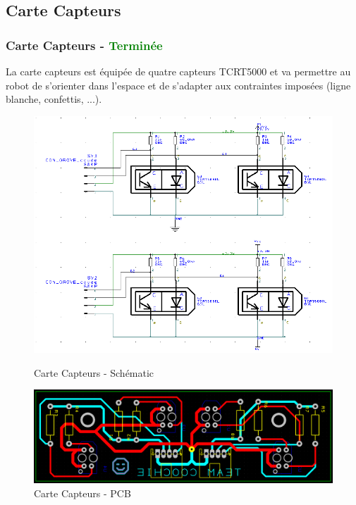 \subsection{Carte Capteurs}
\begin{frame}
    \frametitle{Carte Capteurs - \textcolor{green}{Terminée}}
    La carte capteurs est équipée de quatre capteurs TCRT5000 et va permettre au robot de s'orienter dans l'espace et de s'adapter aux contraintes imposées (ligne blanche, confettis, ...).

    \vfill
    \begin{figure}[H]
        \centering
        \begin{minipage}{.5\textwidth}
            \centering
            \includegraphics[width=.6\linewidth]{Images/carteCapteurs_sch.png}
            \caption{Carte Capteurs - Schématic}
            \label{fig:capteursch}
        \end{minipage}%
        \begin{minipage}{.5\textwidth}
            \centering
            \includegraphics[width=.5\linewidth]{Images/carteCapteurs_pcb.png}
            \caption{Carte Capteurs - PCB}
        \label{fig:capteurpcb}
        \end{minipage}
    \end{figure}

\footer{\hfill\insertframenumber/\inserttotalframenumber}
\end{frame}

